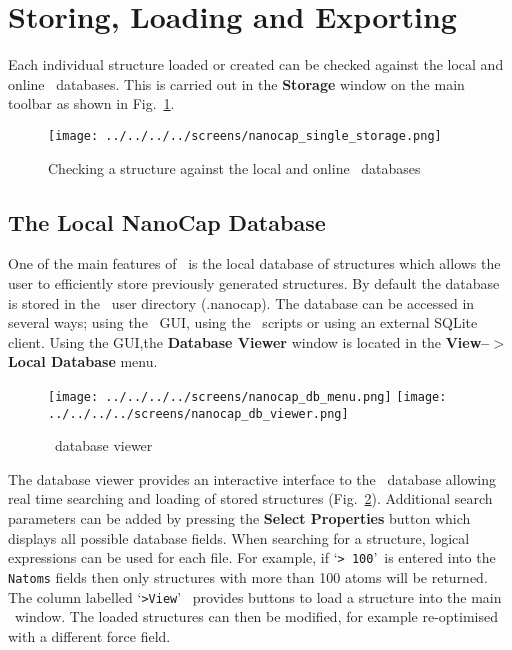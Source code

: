 \section{Storing, Loading and Exporting}

Each individual structure loaded or created can be checked against the local and online \nanocap~databases. This is carried out in the \textbf{Storage} window on the main toolbar as shown in Fig.~\ref{StoreOptions}. 

 \begin{figure}[h!]
\centering
\texttt{[image: ../../../../screens/nanocap\_single\_storage.png]}
\caption{Checking a structure against the local and online \nanocap~databases}
\label{StoreOptions}
\end{figure}


\subsection{The Local NanoCap Database}

One of the main features of \nanocap~is the local database of structures which allows the user to efficiently store previously generated structures. By default the database is stored in the \nanocap~user directory (.nanocap). The database can be accessed in several ways; using the \nanocap~GUI, using the \nanocap~scripts or using an external SQLite client. Using the GUI,the \textbf{Database Viewer} window is located in the  \textbf{View--$>$Local Database} menu. 

 \begin{figure}[h!]
\centering
\texttt{[image: ../../../../screens/nanocap\_db\_menu.png]}
\texttt{[image: ../../../../screens/nanocap\_db\_viewer.png]}
\caption{\nanocap~database viewer}
\label{DBViewer}
\end{figure}

The database viewer provides an interactive interface to the \nanocap~database allowing real time searching and loading of stored structures (Fig.~\ref{DBViewer}). Additional search parameters can be added by pressing the \textbf{Select Properties} button which displays all possible database fields. When searching for a structure, logical expressions can be used for each file. For example, if \lq\texttt{> 100}\rq~is entered into the \texttt{Natoms} fields then only structures with more than 100 atoms will be returned. The column labelled \lq\texttt{>View}\rq~ provides buttons to load a structure into the main \nanocap~window. The loaded structures can then be modified, for example re-optimised with a different force field.

